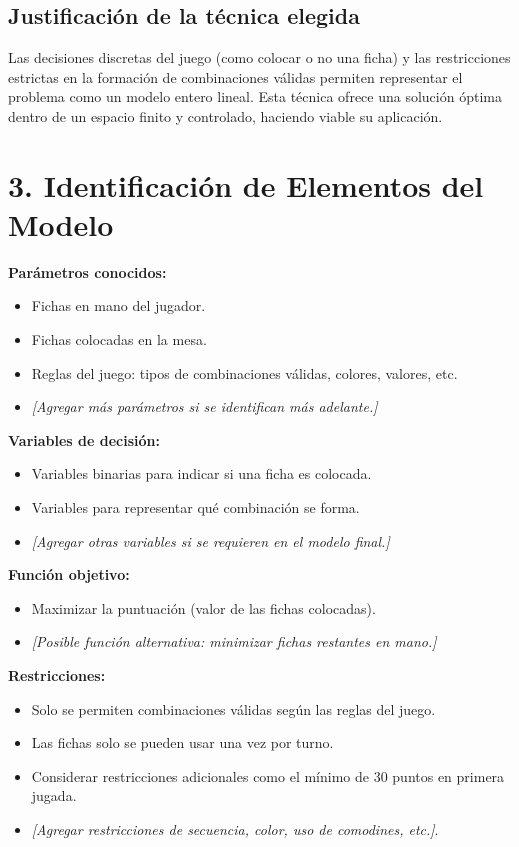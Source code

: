 \documentclass[12pt]{article}
\begin{document}
\subsection*{Justificación de la técnica elegida}
Las decisiones discretas del juego (como colocar o no una ficha) y las restricciones estrictas en la formación de combinaciones válidas permiten representar el problema como un modelo entero lineal. Esta técnica ofrece una solución óptima dentro de un espacio finito y controlado, haciendo viable su aplicación.

\section*{3. Identificación de Elementos del Modelo}

\textbf{Parámetros conocidos:}
\begin{itemize}
    \item Fichas en mano del jugador.
    \item Fichas colocadas en la mesa.
    \item Reglas del juego: tipos de combinaciones válidas, colores, valores, etc.
    \item \textit{[Agregar más parámetros si se identifican más adelante.]}
\end{itemize}

\textbf{Variables de decisión:}
\begin{itemize}
    \item Variables binarias para indicar si una ficha es colocada.
    \item Variables para representar qué combinación se forma.
    \item \textit{[Agregar otras variables si se requieren en el modelo final.]}
\end{itemize}

\textbf{Función objetivo:}
\begin{itemize}
    \item Maximizar la puntuación (valor de las fichas colocadas).
    \item \textit{[Posible función alternativa: minimizar fichas restantes en mano.]}
\end{itemize}

\textbf{Restricciones:}
\begin{itemize}
    \item Solo se permiten combinaciones válidas según las reglas del juego.
    \item Las fichas solo se pueden usar una vez por turno.
    \item Considerar restricciones adicionales como el mínimo de 30 puntos en primera jugada.
    \item \textit{[Agregar restricciones de secuencia, color, uso de comodines, etc.]}.
\end{itemize}
\end{document}
